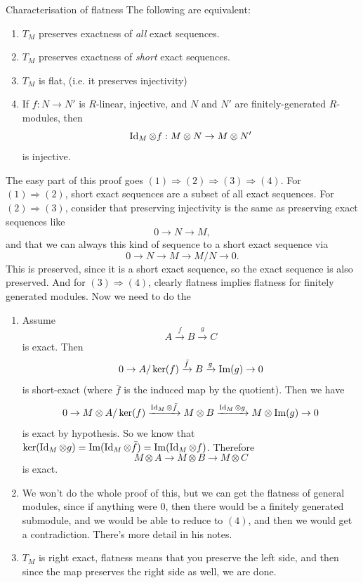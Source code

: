 \documentclass{article}
\begin{document}
\begin{fancyprop}{Characterisation of flatness}
    The following are equivalent: \begin{enumerate}
        \item $T_{M}$ preserves exactness of \textit{all} exact sequences.
        \item $T_{M}$ preserves exactness of \textit{short} exact sequences.
        \item $T_{M}$ is flat, (i.e. it preserves injectivity)
        \item If $f: N \to N'$ is $R$-linear, injective, and $N$ and $N'$ are finitely-generated $R$-modules, then \[ \operatorname{Id}_{M} \otimes f : M \otimes N \to M \otimes N'\] is injective.
    \end{enumerate}
\end{fancyprop}
\proof The easy part of this proof goes $(1) \Rightarrow (2) \Rightarrow (3) \Rightarrow (4)$. For $(1) \Rightarrow (2)$, short exact sequences are a subset of all exact sequences. For $(2) \Rightarrow (3)$, consider that preserving injectivity is the same as preserving exact sequences like \[ 0 \rightarrow N \rightarrow M,\] and that we can always  this kind of sequence to a short exact sequence via \[ 0 \rightarrow N \rightarrow M \rightarrow M/N \rightarrow 0.\] This is preserved, since it is a short exact sequence, so the  exact sequence is also preserved. And for $(3) \Rightarrow (4)$, clearly flatness implies flatness for finitely generated modules. \gap Now we need to do the  \begin{enumerate}
    \item[$(2) \Rightarrow (1)$] Assume \[ A \xrightarrow{f} B \xrightarrow{g} C\] is exact. Then \[ 0 \rightarrow A/ \ker(f) \xrightarrow{\bar f} B \xrightarrow{g} \operatorname{Im}(g) \rightarrow 0\] is short-exact (where $\bar f$ is the induced map by the quotient). Then we have \[ 0 \rightarrow M \otimes A/ \ker(f) \xrightarrow{\operatorname{Id}_{M} \otimes \bar f} M \otimes B \xrightarrow{\operatorname{Id}_{M} \otimes g} M \otimes \operatorname{Im}(g) \rightarrow 0\] is exact by hypothesis. So we know that $\ker(\operatorname{Id}_{M} \otimes g) = \operatorname{Im}(\operatorname{Id}_{M} \otimes \bar f) = \operatorname{Im}(\operatorname{Id}_{M} \otimes f)$. Therefore \[ M \otimes A \rightarrow M \otimes B \rightarrow M \otimes C\] is exact.
    \item[$(4) \Rightarrow (3)$] We won't do the whole proof of this, but we can get the flatness of general modules, since if anything were $0$, then there would be a finitely generated submodule, and we would be able to reduce to $(4)$, and then we would get a contradiction. There's more detail in his notes.
    \item[$(3) \Rightarrow (2)$] $T_{M}$ is right exact, flatness means that you preserve the left side, and then since the map preserves the right side as well, we are done.
\end{enumerate}
\end{document}
